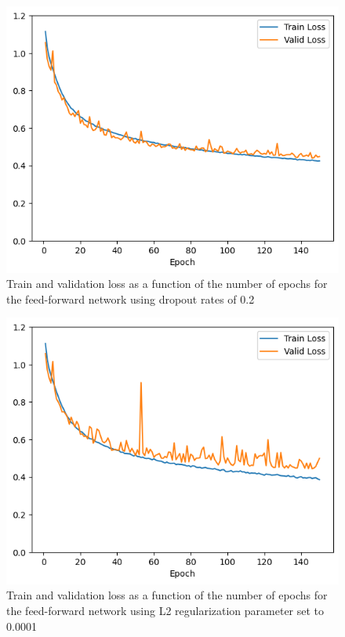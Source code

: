 \documentclass[12pt]{article}
\begin{document}
\begin{itemize}
          \begin{figure}[H]
              \centering
              \includegraphics[width=0.5\linewidth]{../outputs/hw1-q2-2c-dropout-loss.png}
              \caption{Train and validation loss as a function of the number of epochs for the feed-forward network using dropout rates of 0.2}
              \label{fig:2.2c:dropout:loss}
          \end{figure}

          \begin{figure}[H]
              \centering
              \includegraphics[width=0.5\linewidth]{../outputs/hw1-q2-2c-l2-loss.png}
              \caption{Train and validation loss as a function of the number of epochs for the feed-forward network using L2 regularization parameter set to 0.0001}
              \label{fig:2.2c:l2:loss}
          \end{figure}
\end{itemize}
\end{document}
